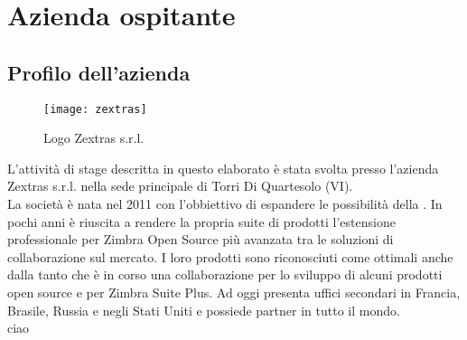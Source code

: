 \chapter{Azienda ospitante}\label{chap:company}

\section{Profilo dell'azienda}
\begin{figure}[H] 
	\centering
	\texttt{[image: zextras]}
	\caption{Logo Zextras s.r.l.}
	\label{fig:logoZextras}
\end{figure}
L'attività di stage descritta in questo elaborato è stata svolta presso l'azienda Zextras s.r.l. nella sede principale di Torri Di Quartesolo (VI). \\
La società è nata nel 2011 con l'obbiettivo di espandere le possibilità della .
In pochi anni è riuscita a rendere la propria suite di prodotti l'estensione professionale per Zimbra Open Source più avanzata tra le soluzioni di collaborazione sul mercato. I loro prodotti sono riconosciuti come ottimali anche dalla  tanto che è in corso una collaborazione per lo sviluppo di alcuni prodotti open source e per Zimbra Suite Plus.
Ad oggi presenta uffici secondari in Francia, Brasile, Russia e negli Stati Uniti e possiede partner in tutto il mondo.\\
ciao

